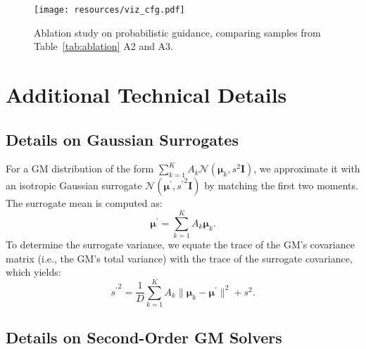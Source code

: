 \documentclass{article}
\def\vmu{{\bm{\mu}}}
\def\mI{{\bm{I}}}
\theoremstyle{custom}
\theoremstyle{definition}
\theoremstyle{remark}
\begin{document}
\begin{figure}[t]
\begin{center}
\texttt{[image: resources/viz\_cfg.pdf]}
\caption{Ablation study on probabilistic guidance, comparing samples from Table~\ref{tab:ablation} A2 and A3.
}
\label{fig:comparisoncfg}
\end{center}
\end{figure} 





\clearpage
\newpage
\appendix


\section{Additional Technical Details}

\subsection{Details on Gaussian Surrogates}
\label{sec:surrogate}

For a GM distribution of the form  $\sum_{k=1}^K A_k \mathcal{N}(\vmu_k, s^2 \mI)$, we approximate it with an isotropic Gaussian surrogate $\mathcal{N}(\vmu^\prime, {s^\prime}^2 \mI)$ by matching the first two moments. The surrogate mean is computed as:
\begin{equation}
    \vmu^\prime = \sum_{k=1}^{K} A_k \vmu_k.
\end{equation}
To determine the surrogate variance, we equate the trace of the GM's covariance matrix (i.e., the GM's total variance) with the trace of the surrogate covariance, which yields:
\begin{equation}
    {s^\prime}^2 = \frac{1}{D} \sum_{k=1}^K A_k \| \vmu_k - \vmu^\prime \|^2 + s^2.
\end{equation}


\subsection{Details on Second-Order GM Solvers}
\label{sec:gm2details}
\end{document}
